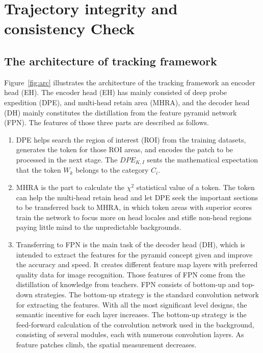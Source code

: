 \documentclass[trans]{IEEEtran}
\newcommand{\el}[1]{{\color{black}#1}}
\begin{document}
\section{Trajectory integrity and consistency Check}
\el{
\subsection{ The architecture of tracking framework}
Figure~\ref{fig:arc} illustrates the architecture of the tracking framework an encoder head (EH). The encoder head (EH) has mainly consisted of deep probe expedition (DPE), and multi-head retain area (MHRA), and the decoder head (DH) mainly constitutes the distillation from the feature pyramid network (FPN). The features of those three parts are described as follows. 

\begin{enumerate}
\item DPE helps search the region of interest (ROI) from the training datasets, generates the token for those ROI areas, and encodes the patch to be processed in the next stage. The $DPE_{K,I} $ sents the mathematical expectation that the token $W_k$  belongs to the category $C_i$. 
\item MHRA is the part to calculate the $\chi^2$ statistical value of a token. The token can help the multi-head retain head and let DPE seek the important sections to be transferred back to MHRA, in which token areas with superior scores train the network to focus more on head locales and stifle non-head regions paying little mind to the unpredictable backgrounds.  
\item Transferring to FPN is the main task of the decoder head (DH), which is intended to extract the features for the pyramid concept given and improve the accuracy and speed. It creates different feature map layers with preferred quality data for image recognition. Those features of FPN come from the distillation of knowledge from teachers. FPN consists of bottom-up and top-down strategies. The bottom-up strategy is the standard convolution network for extracting the features. With all the most significant level designs, the semantic incentive for each layer increases. The bottom-up strategy is the feed-forward calculation of the convolution network used in the background, consisting of several modules, each with numerous convolution layers. As feature patches climb, the spatial measurement decreases.
\end{enumerate}

}
\end{document}
